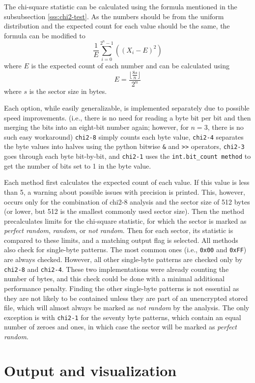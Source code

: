 \documentclass[
  digital, %
  color,   %
  oneside, %
  lof,     %
  nolot,     %
]{fithesis4}
\begin{document}
The chi-square statistic can be calculated using the formula mentioned in the subsubsection \ref{sss:chi2-test}.
As the numbers should be from the uniform distribution and the expected count for each value should be the same, the formula can be modified to
$$\frac{1}{E}\sum_{i = 0}^{2^n - 1}((X_i - E)^2)$$
where $E$ is the expected count of each number and can be calculated using 
$$E = \frac{\lfloor\frac{8s}{n}\rfloor}{2^n}$$
where $s$ is the sector size in bytes.

Each option, while easily generalizable, is implemented separately due to possible speed improvements. 
(i.e., there is no need for reading a byte bit per bit and then merging the bits into an eight-bit number again; however, for $n = 3$, there is no such easy workaround)
\texttt{chi2-8} simply counts each byte value, \texttt{chi2-4} separates the byte values into halves using the python bitwise \texttt{\&} and \texttt{>{>}} operators, \texttt{chi2-3} goes through each byte bit-by-bit, and \texttt{chi2-1} uses the \texttt{int.bit\_count method} to get the number of bits set to 1 in the byte value.

Each method first calculates the expected count of each value.
If this value is less than 5, a warning about possible issues with precision\cite{knuth81} is printed.
This, however, occurs only for the combination of chi2-8 analysis and the sector size of 512 bytes (or lower, but 512 is the smallest commonly used sector size).
Then the method precalculates limits for the chi-square statistic, for which the sector is marked as \emph{perfect random}, \emph{random}, or \emph{not random}.
Then for each sector, its statistic is compared to these limits, and a matching output flag is selected.
All methods also check for single-byte patterns. The most common ones (i.e., \texttt{0x00} and \texttt{0xFF}) are always checked.
However, all other single-byte patterns are checked only by \texttt{chi2-8} and \texttt{chi2-4}.
These two implementations were already counting the number of bytes, and this check could be done with a minimal additional performance penalty.
Finding the other single-byte patterns is not essential as they are not likely to be contained unless they are part of an unencrypted stored file, which will almost always be marked as \emph{not random} by the analysis.
The only exception is with \texttt{chi2-1} for the seventy byte patterns, which contain an equal number of zeroes and ones, in which case the sector will be marked as \emph{perfect random}.

\section{Output and visualization}
\label{sec:output-and-visualization}
\end{document}
